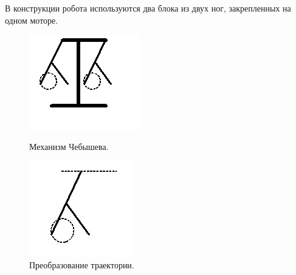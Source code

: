 В конструкции  робота используются два блока из двух ног, закрепленных на одном моторе.


\begin{figure}[h!]
	\begin{minipage}[h!]{0.5\linewidth}
		\begin{center}
			\includegraphics[width=1\linewidth]{chapters/chapter22/images/7}
			\caption{Механизм Чебышева.}
			\label{ris:image22x7}
		\end{center}
	\end{minipage}
	\begin{minipage}[h!]{0.5\linewidth}
		\begin{center}
			\includegraphics[width=1\linewidth]{chapters/chapter22/images/8}
			\caption{Преобразование траектории.}
			\label{ris:image22x8}
		\end{center}
	\end{minipage}
\end{figure}

